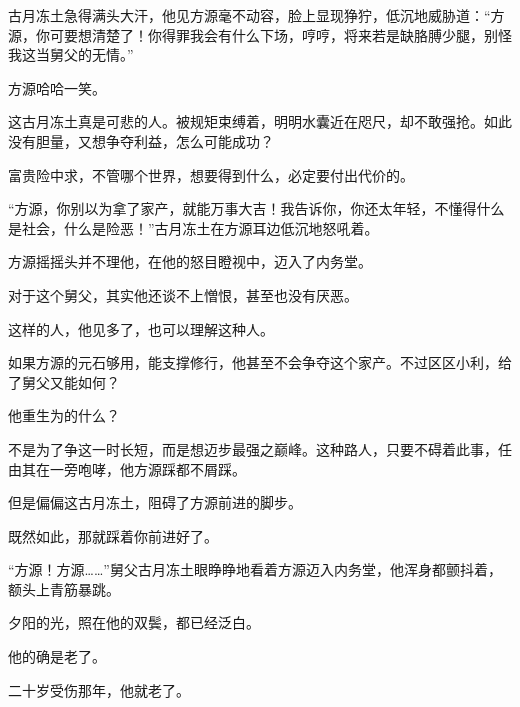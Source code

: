 \begin{this_body}
古月冻土急得满头大汗，他见方源毫不动容，脸上显现狰狞，低沉地威胁道：“方源，你可要想清楚了！你得罪我会有什么下场，哼哼，将来若是缺胳膊少腿，别怪我这当舅父的无情。”

方源哈哈一笑。

这古月冻土真是可悲的人。被规矩束缚着，明明水囊近在咫尺，却不敢强抢。如此没有胆量，又想争夺利益，怎么可能成功？

富贵险中求，不管哪个世界，想要得到什么，必定要付出代价的。

“方源，你别以为拿了家产，就能万事大吉！我告诉你，你还太年轻，不懂得什么是社会，什么是险恶！”古月冻土在方源耳边低沉地怒吼着。

方源摇摇头并不理他，在他的怒目瞪视中，迈入了内务堂。

对于这个舅父，其实他还谈不上憎恨，甚至也没有厌恶。

这样的人，他见多了，也可以理解这种人。

如果方源的元石够用，能支撑修行，他甚至不会争夺这个家产。不过区区小利，给了舅父又能如何？

他重生为的什么？

不是为了争这一时长短，而是想迈步最强之巅峰。这种路人，只要不碍着此事，任由其在一旁咆哮，他方源踩都不屑踩。

但是偏偏这古月冻土，阻碍了方源前进的脚步。

既然如此，那就踩着你前进好了。

“方源！方源……”舅父古月冻土眼睁睁地看着方源迈入内务堂，他浑身都颤抖着，额头上青筋暴跳。

夕阳的光，照在他的双鬓，都已经泛白。

他的确是老了。

二十岁受伤那年，他就老了。

\end{this_body}

